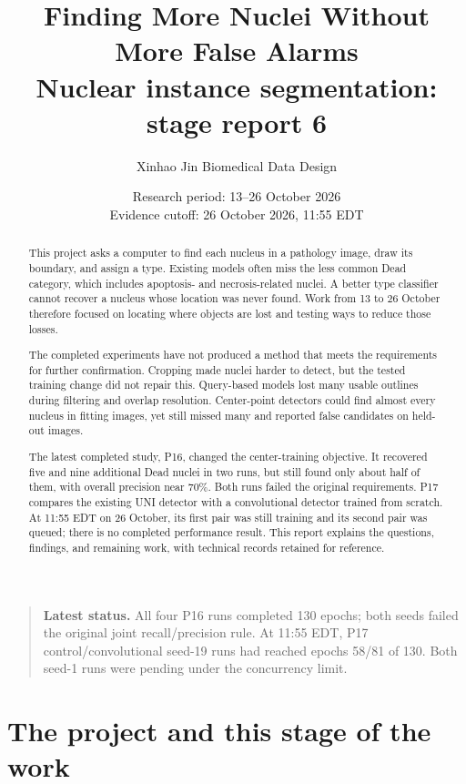 \documentclass[11pt,a4paper]{article}
\title{\bfseries Finding More Nuclei Without More False Alarms\\[8pt]\Large Nuclear instance segmentation: stage report 6}
\author{Xinhao Jin \quad Biomedical Data Design}
\date{Research period: 13--26 October 2026\\Evidence cutoff: 26 October 2026, 11:55 EDT}
\begin{document}
\maketitle
\begin{abstract}
This project asks a computer to find each nucleus in a pathology image, draw its boundary, and assign a type. Existing models often miss the less common Dead category, which includes apoptosis- and necrosis-related nuclei. A better type classifier cannot recover a nucleus whose location was never found. Work from 13 to 26 October therefore focused on locating where objects are lost and testing ways to reduce those losses.

The completed experiments have not produced a method that meets the requirements for further confirmation. Cropping made nuclei harder to detect, but the tested training change did not repair this. Query-based models lost many usable outlines during filtering and overlap resolution. Center-point detectors could find almost every nucleus in fitting images, yet still missed many and reported false candidates on held-out images.

The latest completed study, P16, changed the center-training objective. It recovered five and nine additional Dead nuclei in two runs, but still found only about half of them, with overall precision near 70\%. Both runs failed the original requirements. P17 compares the existing UNI detector with a convolutional detector trained from scratch. At 11:55 EDT on 26 October, its first pair was still training and its second pair was queued; there is no completed performance result. This report explains the questions, findings, and remaining work, with technical records retained for reference.

\end{abstract}

\begin{quote}\small
\textbf{Latest status.} All four P16 runs completed 130 epochs; both seeds failed the original joint recall/precision rule. At 11:55 EDT, P17 control/convolutional seed-19 runs had reached epochs 58/81 of 130. Both seed-1 runs were pending under the concurrency limit.

\end{quote}
\newpage
{\footnotesize\setlength{\parskip}{0pt}\tableofcontents}
\newpage

\section{The project and this stage of the work}
\end{document}
